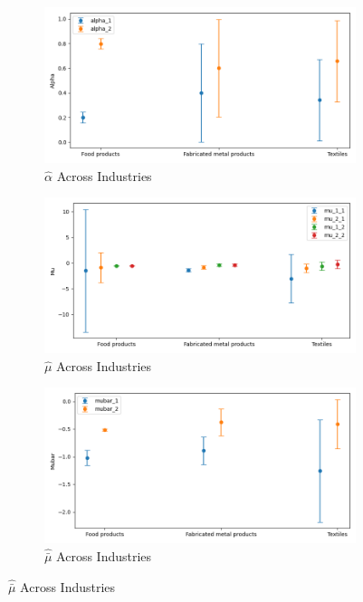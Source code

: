 \documentclass{article}
\begin{document}
\begin{figure}[ht!]
    \centering 
    \caption{Stationary Mixture Model with $\log K$, Import and CIIU Across Industries}
    \begin{subfigure}[t]{0.32\textwidth}
        \centering
        \includegraphics[width=\textwidth]{figure/stationary_mixture_kmshare_ciiu_alpha_across_industries.png}
        \caption{$\hat\alpha$ Across Industries}
    \end{subfigure}
    \begin{subfigure}[t]{0.32\textwidth}
        \centering
        \includegraphics[width=\textwidth]{figure/stationary_mixture_kmshare_ciiu_mu_across_industries.png}
        \caption{$\hat\mu$ Across Industries}
    \end{subfigure}
    \begin{subfigure}[t]{0.32\textwidth}
        \centering
        \includegraphics[width=\textwidth]{figure/stationary_mixture_kmshare_ciiu_mubar_across_industries.png}
        \caption{$\hat{\bar\mu}$ Across Industries}
    \end{subfigure}


\end{figure}
\end{document}
